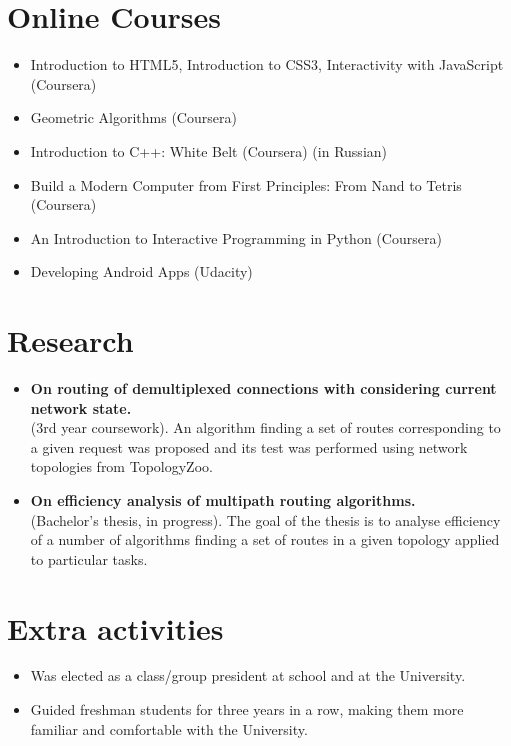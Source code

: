 \documentclass[11pt,a4paper,roman]{moderncv}
\begin{document}
\section{Online Courses}
\begin{itemize}
    \item Introduction to HTML5, Introduction to CSS3, Interactivity with JavaScript (Coursera)
    \item Geometric Algorithms (Coursera)
    \item Introduction to C++: White Belt (Coursera) (in Russian)
    \item Build a Modern Computer from First Principles: From Nand to Tetris (Coursera)
    \item An Introduction to Interactive Programming in Python (Coursera)
    \item Developing Android Apps (Udacity)
\end{itemize}


\section{Research}
  {\begin{itemize}
   \item \textbf{On routing of demultiplexed connections with considering current network state.}\\
   (3rd year coursework). An algorithm finding a set of routes corresponding to a given request was proposed and its test was performed using network topologies from TopologyZoo.

   \item \textbf{On efficiency analysis of multipath routing algorithms.}\\
   (Bachelor's thesis, in progress). The goal of the thesis is to analyse efficiency of a number of algorithms finding a set of routes in a given topology applied to particular tasks.
 \end{itemize}
}


\section{Extra activities}
   	\begin{itemize}
         \item Was elected as a class/group president at school and at the University.
         \item Guided freshman students for three years in a row, making them more familiar and comfortable with the University.
	\end{itemize}
\end{document}
